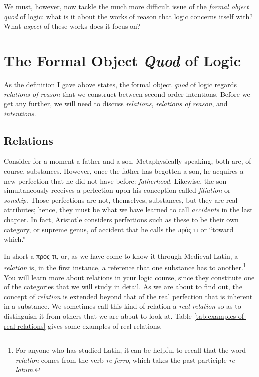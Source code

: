\documentclass[
  12pt,
]{memoir}
\begin{document}
We must, however, now tackle the much more difficult issue of the
\emph{formal object quod} of logic: what is it about the works of reason
that logic concerns itself with? What \emph{aspect} of these works does
it focus on?

\section{\texorpdfstring{The Formal Object \emph{Quod} of
Logic}{The Formal Object Quod of Logic}}\label{the-formal-object-quod-of-logic}

As the definition I gave above states, the formal object \emph{quod} of
logic regards \emph{relations of reason} that we construct between
second-order intentions. Before we get any further, we will need to
discuss \emph{relations}, \emph{relations of reason}, and
\emph{intentions}.

\subsection{Relations}\label{relations}

Consider for a moment a father and a son. Metaphysically speaking, both
are, of course, substances. However, once the father has begotten a son,
he acquires a new perfection that he did not have before:
\emph{fatherhood}. Likewise, the son simultaneously receives a
perfection upon his conception called \emph{filiation} or
\emph{sonship}. Those perfections are not, themselves, substances, but
they are real attributes; hence, they must be what we have learned to
call \emph{accidents} in the last chapter. In fact, Aristotle considers
perfections such as these to be their own category, or supreme genus, of
accident that he calls the πρός τι or ``toward which.''

In short a πρός τι, or, as we have come to know it through Medieval
Latin, a \emph{relation} is, in the first instance, a reference that one
substance has to another.\footnote{For anyone who has studied Latin, it
  can be helpful to recall that the word \emph{relation} comes from the
  verb \emph{re-ferro}, which takes the past participle \emph{re-latum}.}
You will learn more about relations in your logic course, since they
constitute one of the categories that we will study in detail. As we are
about to find out, the concept of \emph{relation} is extended beyond
that of the real perfection that is inherent in a substance. We
sometimes call this kind of relation a \emph{real relation} so as to
distinguish it from others that we are about to look at. Table
\ref{tab:examples-of-real-relations} gives some examples of real
relations.
\end{document}
